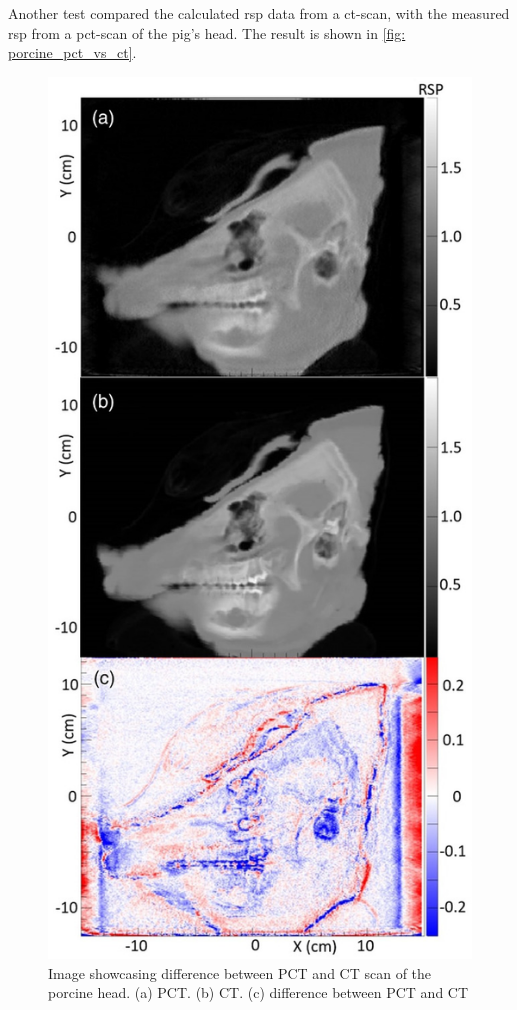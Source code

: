 \documentclass[main.tex]{subfiles}
\begin{document}
Another test compared the calculated \gls{rsp} data from a \gls{ct}-scan, with the measured \gls{rsp} from a \gls{pct}-scan of the pig's head. The result is shown in \autoref{fig: porcine_pct_vs_ct}.

\begin{figure}[!ht]
    \centering
    \includegraphics[scale=2.5]{images/porcine_comparison.jpg}
    \caption{Image showcasing difference between PCT and CT scan of the porcine head. (a) PCT. (b) CT. (c) difference between PCT and CT \cite{porcine_2021}}
    \label{fig: porcine_pct_vs_ct}
\end{figure}
\FloatBarrier
\end{document}
